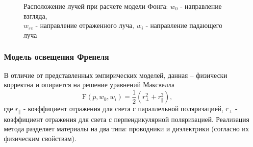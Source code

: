 \begin{figure}[h]
    \centering
    \def\svgwidth{0.6\textwidth}
    
    \caption{Расположение лучей при расчете модели Фонга: $w_0$ - направление
             взгляда,\\ $w_{re}$ - направление отраженного луча, $w_i$ -
             направление падающего луча}
    \label{fig:specular}
\end{figure}

\subsubsection{Модель освещения Френеля}
В отличие от представленных эмпирических моделей, данная -- физически
корректна и опирается на решение уравнений Максвелла
\begin{equation} \label{math:ffresnel}
    \mathrm{F}(p, w_0, w_i) = \frac12(r_\perp^2 + r_\parallel^2),
\end{equation}
где $r_\parallel$ - коэффициент отражения для света с параллельной поляризацией,
$r_\perp$ - коэффициент отражения для света с перпендикулярной поляризацией.
Реализация метода разделяет материалы на два типа: проводники и
диэлектрики (согласно их физическим свойствам).

